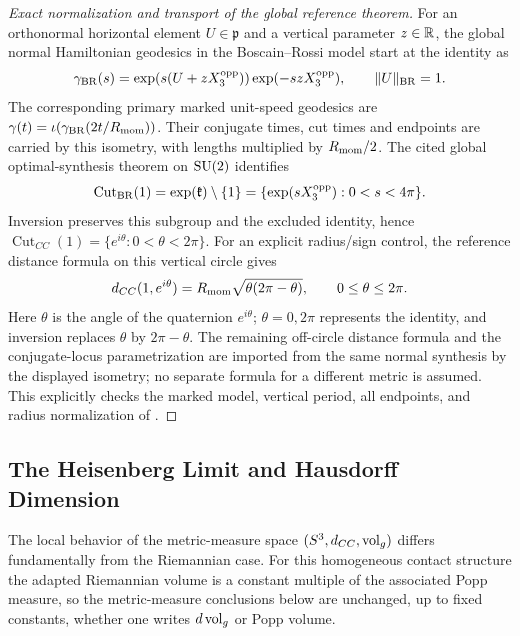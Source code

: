 \documentclass[11pt]{article}
\begin{document}
\begin{proof}[Exact normalization and transport of the global reference theorem]
For an orthonormal horizontal element $U\in\mathfrak p$ and a vertical
parameter $z\in\mathbb{R}$, the global normal Hamiltonian geodesics in the
Boscain--Rossi model start at the identity as
\[
 \gamma_{\rm BR}(s)=\exp(s(U+zX^{\rm opp}_3))
                        \exp(-szX^{\rm opp}_3),\qquad
 \|U\|_{\rm BR}=1.
\]
The corresponding primary marked unit-speed geodesics are
$\gamma(t)=\iota(\gamma_{\rm BR}(2t/R_{\mathrm{mom}}))$.
Their conjugate times, cut times and endpoints are carried by this
isometry, with lengths multiplied by $R_{\mathrm{mom}}/2$.
The cited global optimal-synthesis theorem on $\mathrm{SU}(2)$ identifies
\[
 \operatorname{Cut}_{\rm BR}(1)
  =\exp(\mathfrak k)\setminus\{1\}
  =\{\exp(sX^{\rm opp}_3):0<s<4\pi\}.
\]
Inversion preserves this subgroup and the excluded identity, hence
$\operatorname{Cut}_{CC}(1)=\{e^{i\theta}:0<\theta<2\pi\}$.
For an explicit radius/sign control, the reference distance formula on
this vertical circle gives
\[
 d_{CC}(1,e^{i\theta})
  =R_{\mathrm{mom}}\sqrt{\theta(2\pi-\theta)},\qquad 0\le\theta\le2\pi.
\]
Here $\theta$ is the angle of the quaternion $e^{i\theta}$;
$\theta=0,2\pi$ represents the identity, and inversion replaces
$\theta$ by $2\pi-\theta$.  The remaining off-circle distance formula
and the conjugate-locus parametrization are imported from the same
normal synthesis by the displayed isometry; no separate formula for a
different metric is assumed.  This explicitly checks the marked model,
vertical period, all endpoints, and radius normalization of
\cite[Theorems~5--6]{boscainrossi2008cc}.
\end{proof}


\subsection{The Heisenberg Limit and Hausdorff Dimension}

The local behavior of the metric-measure space \((S^3,d_{CC},\operatorname{vol}_g)\) differs fundamentally from the Riemannian case.  For this homogeneous contact structure the adapted Riemannian volume is a constant multiple of the associated Popp measure, so the metric-measure conclusions below are unchanged, up to fixed constants, whether one writes \(d\operatorname{vol}_g\) or Popp volume.
\end{document}
